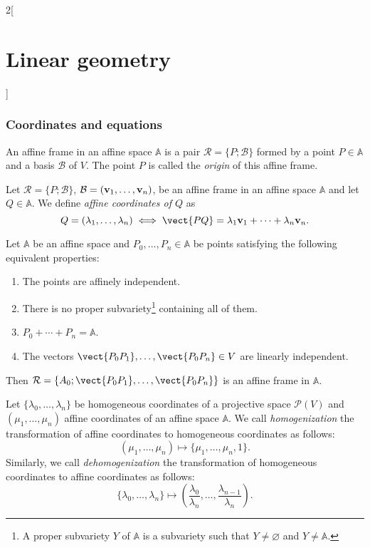 \documentclass[../../../main.tex]{subfiles}
\begin{document}
\begin{multicols}{2}[\section{Linear geometry}]
    \subsubsection*{Coordinates and equations}
    \begin{definition}
        An affine frame in an affine space $\mathbb{A}$ is a pair $\mathcal{R}=\{P;\mathcal{B}\}$ formed by a point $P\in\mathbb{A}$ and a basis $\mathcal{B}$ of $V$. The point $P$ is called the \textit{origin} of this affine frame.
    \end{definition}
    \begin{definition}
        Let $\mathcal{R}=\{P;\mathcal{B}\}$, $\mathcal{B}=(\boldsymbol{\mathrm{v}}_1,\ldots,\boldsymbol{\mathrm{v}}_n)$, be an affine frame in an affine space $\mathbb{A}$ and let $Q\in\mathbb{A}$. We define \textit{affine coordinates of $Q$} as $$Q=(\lambda_1,\ldots,\lambda_n)\iff\vect{PQ}=\lambda_1\vectorfunction{v}_1+\cdots+\lambda_n\vectorfunction{v}_n.$$
    \end{definition}
    \begin{prop}
        Let $\mathbb{A}$ be an affine space and $P_0,\ldots,P_n\in\mathbb{A}$ be points satisfying the following equivalent properties:
        \begin{enumerate}
            \item The points are affinely independent.
            \item There is no proper subvariety\footnote{A proper subvariety $Y$ of $\mathbb{A}$ is a subvariety such that $Y\ne\varnothing$ and  $Y\ne\mathbb{A}$.} containing all of them.
            \item $P_0+\cdots+P_n=\mathbb{A}$.
            \item The vectors $\vect{P_0P_1},\ldots,\vect{P_0P_n}\in V$ are linearly independent.
        \end{enumerate}
        Then $\mathcal{R}=\{A_0;\vect{P_0P_1},\ldots,\vect{P_0P_n}\}$ is an affine frame in $\mathbb{A}$.
    \end{prop}
    \begin{definition}
        Let $\{\lambda_0,\ldots,\lambda_n\}$ be homogeneous coordinates of a projective space $\mathcal{P}(V)$ and $(\mu_1,\ldots,\mu_n)$ affine coordinates of an affine space $\mathbb{A}$. We call \textit{homogenization} the transformation of affine coordinates to homogeneous coordinates as follows: $$(\mu_1,\ldots,\mu_n)\longmapsto\{\mu_1,\ldots,\mu_n,1\}.$$ Similarly, we call \textit{dehomogenization} the transformation of homogeneous coordinates to affine coordinates as follows: $$\{\lambda_0,\ldots,\lambda_n\}\longmapsto\left(\frac{\lambda_0}{\lambda_n},\ldots,\frac{\lambda_{n-1}}{\lambda_n}\right).$$

\end{definition}
\end{multicols}
\end{document}
